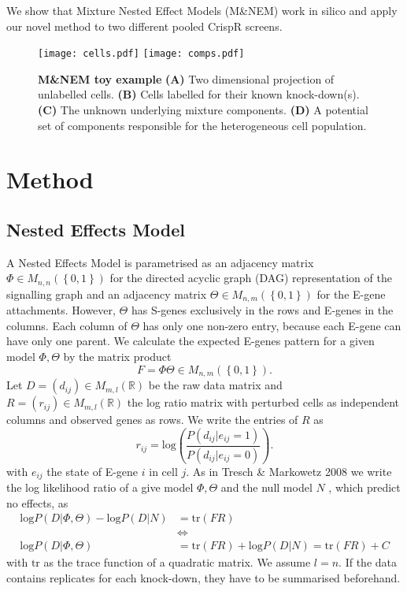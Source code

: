 \documentclass[12pt]{article}
\begin{document}
We show that Mixture Nested Effect Models (M\&NEM) work in silico and apply our novel method to two different pooled CrispR screens.

\begin{figure}
\begin{center}
\texttt{[image: cells.pdf]}
\texttt{[image: comps.pdf]}
\end{center}
\caption{\textbf{M\&NEM toy example} \textbf{(A)} Two dimensional projection of unlabelled cells. \textbf{(B)} Cells labelled for their known knock-down(s). \textbf{(C)} The unknown underlying mixture components. \textbf{(D)} A potential set of components responsible for the heterogeneous cell population.}\label{fig:toy}
\end{figure}


\section{Method}
\subsection{Nested Effects Model}
A Nested Effects Model is parametrised as an adjacency matrix $\Phi \in M_{n,n}(\left\{0,1\right\})$ for the directed acyclic graph (DAG) representation of the signalling graph and an adjacency matrix $\Theta \in M_{n,m}(\left\{0,1\right\})$ for the E-gene attachments. However, $\Theta$ has S-genes exclusively in the rows and E-genes in the columns. Each column of $\Theta$ has only one non-zero entry, because each E-gene can have only one parent. We calculate the expected E-genes pattern for a given model $\Phi, \Theta$ by the matrix product
\begin{equation*}
F = \Phi\Theta \in M_{n,m}(\left\{0,1\right\}).
\end{equation*}
Let $D = (d_{ij}) \in M_{m,l}(\mathbb{R})$ be the raw data matrix and  $R = (r_{ij}) \in M_{m,l}(\mathbb{R})$ the log ratio matrix with perturbed cells as independent columns and observed genes as rows. We write the entries of $R$ as
\begin{equation*}
r_{ij} = \mathrm{log}\left( \frac{P(d_{ij}|e_{ij} = 1)}{P(d_{ij}|e_{ij} = 0)} \right).
\end{equation*}
with $e_{ij}$ the state of E-gene $i$ in cell $j$. As in Tresch \& Markowetz 2008 we write the log likelihood ratio of a give model $\Phi, \Theta$ and the null model $N$ , which predict no effects, as
\begin{align*}
\mathrm{log}P(D|\Phi,\Theta) - \mathrm{log}P(D|N) &= \mathrm{tr}(FR)\nonumber\\
&\Leftrightarrow\nonumber\\
\mathrm{log}P(D|\Phi, \Theta) &= \mathrm{tr}(FR) + \mathrm{log}P(D|N) = \mathrm{tr}(FR) + C
\end{align*}
with $\mathrm{tr}$ as the trace function of a quadratic matrix. We assume $l=n$. If the data contains replicates for each knock-down, they have to be summarised beforehand.
\end{document}
